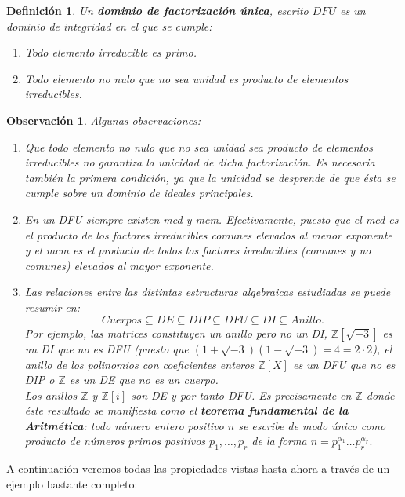 \documentclass[12pt]{article}
\newtheorem{definition}[theorem]{Definición}
\newtheorem{observation}{Observación}[theorem]
\begin{document}
\begin{definition}\label{eq:defdfu} Un \textbf{dominio de factorización única}, escrito $DFU$ es un dominio de integridad en el que se cumple: \begin{enumerate}
\item Todo elemento irreducible es primo.
\item Todo elemento no nulo que no sea unidad es producto de elementos irreducibles.
\end{enumerate}
\end{definition}

\begin{observation} Algunas observaciones:\begin{enumerate}
\item Que todo elemento no nulo que no sea unidad sea producto de elementos irreducibles no garantiza la unicidad de dicha factorización. Es necesaria también la primera condición, ya que la unicidad se desprende de que ésta se cumple sobre un dominio de ideales principales.
\item En un DFU siempre existen mcd y mcm. Efectivamente, puesto que el mcd es el producto de los factores irreducibles comunes elevados al menor exponente y el mcm es el producto de todos los factores irreducibles (comunes y no comunes) elevados al mayor exponente.
\item Las relaciones entre las distintas estructuras algebraicas estudiadas se puede resumir en: $$Cuerpos \subseteq DE \subseteq DIP \subseteq DFU 	\subseteq DI \subseteq Anillo.$$
Por ejemplo, las matrices constituyen un anillo pero no un DI, $\mathbb{Z}[\sqrt{-3}]$ es un DI que no es DFU (puesto que $(1+\sqrt{-3})(1-\sqrt{-3}) = 4 = 2 \cdot 2$), el anillo de los polinomios con coeficientes enteros $\mathbb{Z}[X]$ es un DFU que no es DIP o $\mathbb{Z}$ es un DE que no es un cuerpo. \vspace{0.3cm}\\
Los anillos $\mathbb{Z}$ y $\mathbb{Z}[i]$ son DE y por tanto DFU. Es precisamente en $\mathbb{Z}$ donde éste resultado se manifiesta como el \textbf{\textit{teorema fundamental de la Aritmética}}: \textit{todo número entero positivo $n$ se escribe de modo único como producto de números primos positivos $p_{1}, \ldots, p_{r}$ de la forma $n = p_{1}^{\alpha_{1}} \ldots p_{r}^{\alpha_{r}}.$}
\end{enumerate}
\end{observation}

A continuación veremos todas las propiedades vistas hasta ahora a través de un ejemplo bastante completo:
\end{document}
